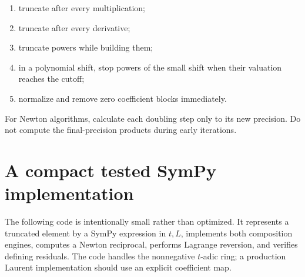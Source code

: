 \documentclass[11pt,oneside,openany]{book}
\begin{document}
\begin{enumerate}
\item truncate after every multiplication;
\item truncate after every derivative;
\item truncate powers while building them;
\item in a polynomial shift, stop powers of the small shift when their
valuation reaches the cutoff;
\item normalize and remove zero coefficient blocks immediately.
\end{enumerate}

For Newton algorithms, calculate each doubling step only to its new precision.
Do not compute the final-precision products during early iterations.

\section{A compact tested SymPy implementation}
The following code is intentionally small rather than optimized.  It represents
a truncated element by a SymPy expression in \(t,L\), implements both
composition engines, computes a Newton reciprocal, performs Lagrange reversion,
and verifies defining residuals.  The code handles the nonnegative
\(t\)-adic ring; a production Laurent implementation should use an explicit
coefficient map.
\end{document}
